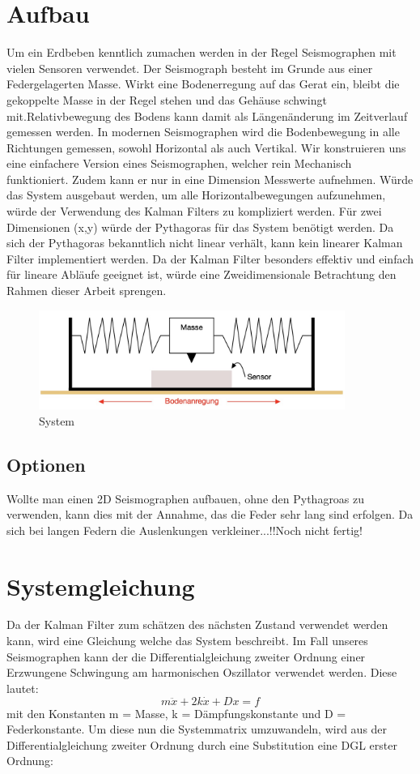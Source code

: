 \documentclass[11pt,a4paper]{article}
\begin{document}
\section{Aufbau}
Um ein Erdbeben kenntlich zumachen werden in der Regel Seismographen mit vielen Sensoren verwendet. 
Der Seismograph besteht im Grunde aus einer Federgelagerten Masse. Wirkt eine Bodenerregung auf das Gerat ein, bleibt die gekoppelte Masse in der Regel stehen und das Gehäuse schwingt mit.Relativbewegung des Bodens kann damit als Längenänderung im Zeitverlauf gemessen werden. In modernen Seismographen wird die Bodenbewegung in alle Richtungen gemessen, sowohl Horizontal als auch Vertikal. 
Wir konstruieren uns eine einfachere Version eines Seismographen, welcher rein Mechanisch funktioniert. Zudem kann er nur in eine Dimension Messwerte aufnehmen. Würde das System ausgebaut werden, um alle Horizontalbewegungen aufzunehmen, würde der Verwendung des Kalman Filters zu kompliziert werden. Für zwei Dimensionen (x,y) würde der Pythagoras für das System benötigt werden. Da sich der Pythagoras bekanntlich nicht linear verhält, kann kein linearer Kalman Filter implementiert werden. Da der Kalman Filter besonders effektiv und einfach für lineare Abläufe geeignet ist, würde eine Zweidimensionale Betrachtung den Rahmen dieser Arbeit sprengen. 
\begin{figure}[h]
 \begin{center}
 \includegraphics[width=10cm]{papers/erdbeben/Apperatur}
 \caption{System}
 \end{center}
\end{figure}


\subsection{Optionen}
Wollte man einen 2D Seismographen aufbauen, ohne den Pythagroas zu verwenden, kann dies mit der Annahme, das die Feder sehr lang sind erfolgen. Da sich bei langen Federn die Auslenkungen verkleiner...!!Noch nicht fertig!

\section{Systemgleichung}
Da der Kalman Filter zum schätzen des nächsten Zustand verwendet werden kann, wird eine Gleichung welche das System beschreibt. Im Fall unseres Seismographen kann der die Differentialgleichung zweiter Ordnung einer Erzwungene Schwingung am harmonischen Oszillator verwendet werden. Diese lautet:
\begin{equation}
m\ddot x + 2k \dot x + Dx = f
\end{equation}
mit den Konstanten m = Masse, k = Dämpfungskonstante und D  = Federkonstante.
Um diese nun die Systemmatrix umzuwandeln, wird aus der Differentialgleichung zweiter Ordnung durch eine Substitution eine DGL erster Ordnung:
\end{document}
